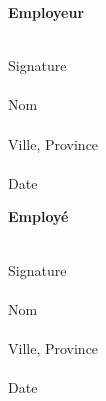 \documentclass{article}
\begin{document}
    \begin{minipage}[t]{0.45\textwidth}
    	{\bfseries Employeur} \\ \smallskip
    	
    	\underline{\hspace{\textwidth}} \\
    	Signature \\[0.5cm]
    	\underline{\hspace{\textwidth}} \\
    	Nom \\[0.5cm]
    	\underline{\hspace{\textwidth}} \\
    	Ville, Province \\[0.5cm]
    	\underline{\hspace{\textwidth}} \\
    	Date \\
    \end{minipage}%
    \hfill%
    \begin{minipage}[t]{0.45\textwidth}
    	{\bfseries Employé} \\ \smallskip
    	
    	\underline{\hspace{\textwidth}} \\
    	Signature \\[0.5cm]
    	\underline{\hspace{\textwidth}} \\
    	Nom \\[0.5cm]
    	\underline{\hspace{\textwidth}} \\
    	Ville, Province \\[0.5cm]
    	\underline{\hspace{\textwidth}} \\
    	Date \\
    \end{minipage}
    
    
    

    
    
        
\end{document}
